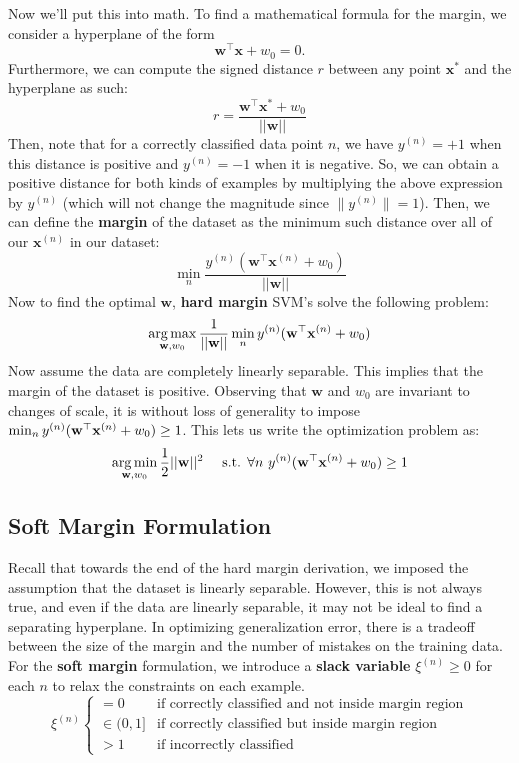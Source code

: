 \documentclass[11pt, letterpaper]{article}
\theoremstyle{definition}
\theoremstyle{plain}
\begin{document}
Now we'll put this into math. To find a mathematical formula for the margin, we consider a hyperplane of the form
\[\bm{w}^\top \bm x + w_0 = 0.\]
Furthermore, we can compute the signed distance $r$ between any point $\bm{x}^*$ and the hyperplane as such:
\[r = \frac{\bm{w}^\top\bm{x}^*+w_0}{||\bm{w}||}\]
Then, note that for a correctly classified data point $n$, we have $y^{(n)}=+1$ when this distance is positive and $y^{(n)}=-1$ when it is negative. So, we can obtain a positive distance for both kinds of examples by multiplying the above expression by $y^{(n)}$ (which will not change the magnitude since $\|y^{(n)}\| =  1$). Then, we can define the \textbf{margin }of the dataset as the minimum such distance over all of our $\bm{x}^{(n)}$ in our dataset:
\[\min_{n} \frac{y^{(n)}(\bm{w}^\top\bm{x}^{(n)} + w_0)}{||\bm{w}||}\]
Now to find the optimal $\bm{w}$, \textbf{hard margin} SVM's solve the following problem:
\[\argmax_{\boldw,w_0} \frac{1}{||\boldw||} \min_n y^{(n)}(\boldw^\top\boldx^{(n)}+w_0)\]
Now assume the data are completely linearly separable. This implies that the margin of the dataset is positive. Observing that $\bm{w}$ and $w_0$ are invariant to changes of scale, it is without loss of generality to impose
$\min_{n} y^{(n)}(\mathbf{w}^\top\mathbf{x}^{(n)} + w_0) \ge 1$. This lets
us write the optimization problem as:
\[\argmin_{\boldw, w_0} \frac{1}{2}||\boldw||^2 \quad \text{ s.t. }\forall n\text{ }
y^{(n)}(\boldw^\top\boldx^{(n)}+w_0) \geq 1\]

\subsection{Soft Margin Formulation}
Recall that towards the end of the hard margin derivation, we imposed the assumption that the dataset is linearly separable. However, this is not always true, and even if the data are linearly separable, it may not be ideal to find a separating hyperplane. In optimizing generalization error, there is a
tradeoff between the size of the margin and the number of mistakes on the training data. For the \textbf{soft margin} formulation, we introduce a \textbf{slack variable} $\xi^{(n)}
\geq 0$ for each $n$ to relax the constraints on each example.
%
$$
\xi^{(n)} \begin{cases}
      =0 & \text{if correctly classified and not inside margin region} \\
      \in (0,1] & \text{if correctly classified but inside margin
        region}\\
      >1 & \text{if incorrectly classified}
   \end{cases}
$$
\end{document}
